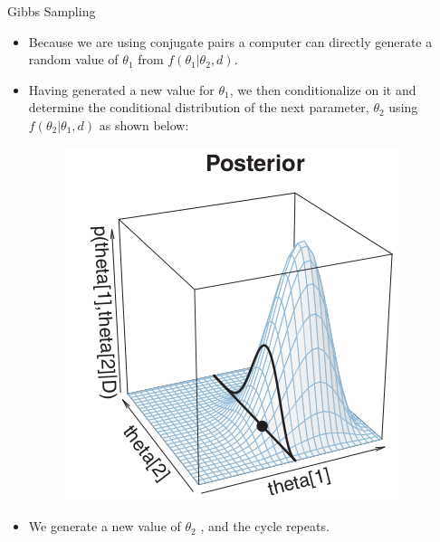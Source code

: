 \documentclass[handout]{beamer}
\begin{document}
\begin{frame}{Gibbs Sampling}
\scriptsize{


\begin{itemize}

\item Because we are using conjugate pairs a computer can directly generate a random  value of $\theta_1$ from $f(\theta_1|\theta_2 , d)$. 

\item Having generated a new value for $\theta_1$, we then conditionalize on it and determine the conditional distribution of the next parameter, $\theta_2$ using $f(\theta_2|\theta_1 , d)$  as shown below:

 \begin{figure}[h!]
	\centering
	\includegraphics[scale=0.4]{pics/gibbs2.png}
	\end{figure} 

\item We generate a new value of $\theta_2$ , and the cycle repeats.



\end{itemize}


} 
\end{frame}
\end{document}
